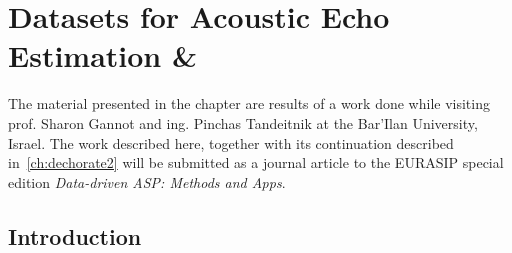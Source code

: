\chapter{Datasets for Acoustic Echo Estimation \& }\label{ch:dechorate}

\vspace{-2.5em}

 \synopsisChDechorate


\mynewline
The material presented in the chapter are results of a work done while visiting prof. Sharon Gannot and ing. Pinchas Tandeitnik at the Bar'Ilan University, Israel.
The work described here, together with its continuation described in~\cref{ch:dechorate2} will be submitted as a journal article to the EURASIP special edition \textit{Data-driven ASP: Methods and Apps}.

\section{Introduction}\label{sec:dechorate:intro}


